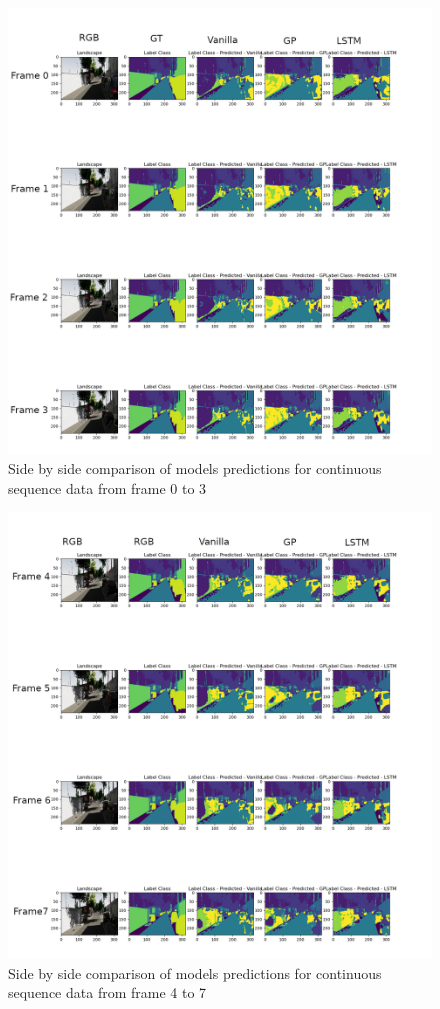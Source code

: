 	\begin{figure}
		\centering
		\includegraphics[width=19cm]{images/continuous_sequence_data1.png}
		\caption{Side by side comparison of models predictions for continuous sequence data from frame 0 to 3}
		\label{fig:performance_metric_three_classes}
	\end{figure}

	\begin{figure}
		\centering
		\includegraphics[width=19cm]{images/continuous_sequence_data2.png}
		\caption{Side by side comparison of models predictions for continuous sequence data from frame 4 to 7}
		\label{fig:performance_metric_three_classes}
	\end{figure}

